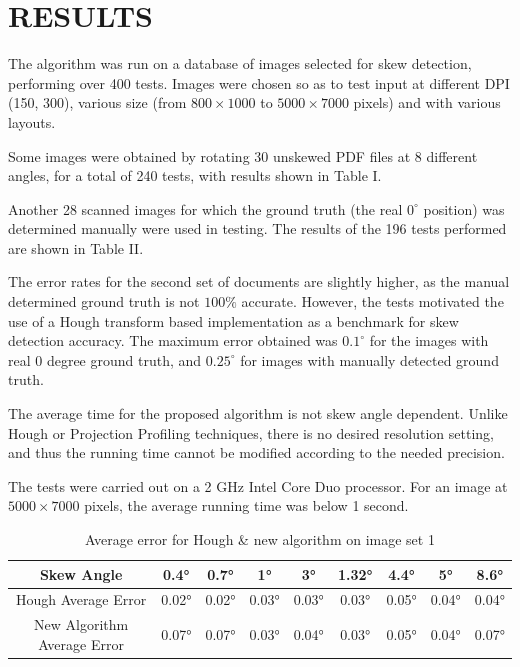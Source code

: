 \documentclass[10pt,a4paper]{article}
\begin{document}
	\section{RESULTS}
	The algorithm was run on a database of images selected for skew detection, performing over 400 tests. Images were chosen so as to test input at different DPI (150, 300), various size (from \(800 \times 1000\) to \(5000 \times 7000\) pixels) and with various layouts.
	
	Some images were obtained by rotating 30 unskewed PDF files at 8 different angles, for a total of 240 tests, with results shown in Table I.
	
	Another 28 scanned images for which the ground truth (the real \(0^{\circ}\) position) was determined manually were used in testing. The results of the 196 tests performed are shown in Table II.
	
	The error rates for the second set of documents are slightly higher, as the manual determined ground truth is not \(100\%\) accurate. However, the tests motivated the use of a Hough transform based implementation as a benchmark for skew detection accuracy. The maximum error obtained was \(0.1^{\circ}\) for the images with real 0 degree ground truth, and \(0.25^{\circ}\) for images with manually detected ground truth.
	
	The average time for the proposed algorithm is not skew angle dependent. Unlike Hough or Projection Profiling techniques, there is no desired resolution setting, and thus the running time cannot be modified according to the needed precision.
	
	The tests were carried out on a 2 GHz Intel Core Duo processor. For an image at \(5000 \times 7000\) pixels, the average running time was below 1 second.
	
	\begin{table}[h]
		\centering
		\caption{Average error for Hough \& new algorithm on image set 1}
		\label{tab:set1}
		\begin{tabular}{ccccccccc}
			\toprule
			Skew Angle & 0.4° & 0.7° & 1° & 3° & 1.32° & 4.4° & 5° & 8.6° \\
			\midrule
			Hough Average Error & 0.02° & 0.02° & 0.03° & 0.03° & 0.03° & 0.05° & 0.04° & 0.04° \\
			New Algorithm Average Error & 0.07° & 0.07° & 0.03° & 0.04° & 0.03° & 0.05° & 0.04° & 0.07° \\
			\bottomrule
		\end{tabular}
	\end{table}
	
\end{document}
